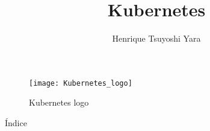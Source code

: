 \documentclass{beamer}
\title {Kubernetes}
\author {Henrique Tsuyoshi Yara}
\institute {OPUS-software}
\begin{document}
\begin{frame}{\titlepage}
	\begin{figure}[htpb]
		\centering
		\texttt{[image: Kubernetes\_logo]}
		\caption{Kubernetes logo}
	\end{figure}
\end{frame}

\begin{frame}{Índice}
\begin{multicols}{2}
  \tableofcontents
\end{multicols}
\end{frame}












\end{document}
